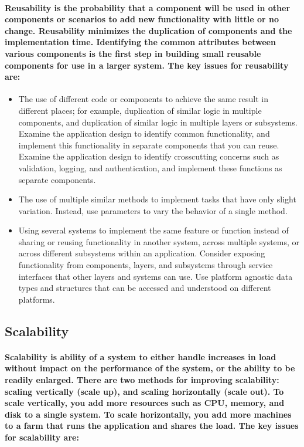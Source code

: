 \documentclass[../Psychological_system_web_application.tex]{subfiles}
\begin{document}
			
				\paragraph{\gls{Reusability} is the probability that a component will be used in other components or scenarios to add new functionality with little or no change. Reusability minimizes the duplication of components and the implementation time. Identifying the common attributes between various components is the first step in building small reusable components for use in a larger system. The key issues for reusability are:}
			
				\begin{itemize}
					\item
						The use of different code or components to achieve the same result in different places; for example, duplication of similar logic in multiple components, and duplication of similar logic in multiple layers or subsystems. Examine the application design to identify common functionality, and implement this functionality in separate components that you can reuse. Examine the application design to identify crosscutting concerns such as validation, logging, and authentication, and implement these functions as separate components.
					\item
						The use of multiple similar methods to implement tasks that have only slight variation. Instead, use parameters to vary the behavior of a single method.
					\item
						Using several systems to implement the same feature or function instead of sharing or reusing functionality in another system, across multiple systems, or across different subsystems within an application. Consider exposing functionality from components, layers, and subsystems through service interfaces that other layers and systems can use. Use platform agnostic data types and structures that can be accessed and understood on different platforms.
					
				\end{itemize}
				
				
			\subsection{Scalability}
			
				\paragraph{\gls{Scalability} is ability of a system to either handle increases in load without impact on the performance of the system, or the ability to be readily enlarged. There are two methods for improving scalability: scaling vertically (scale up), and scaling horizontally (scale out). To scale vertically, you add more resources such as CPU, memory, and disk to a single system. To scale horizontally, you add more machines to a farm that runs the application and shares the load. The key issues for scalability are:}
			
\end{document}
